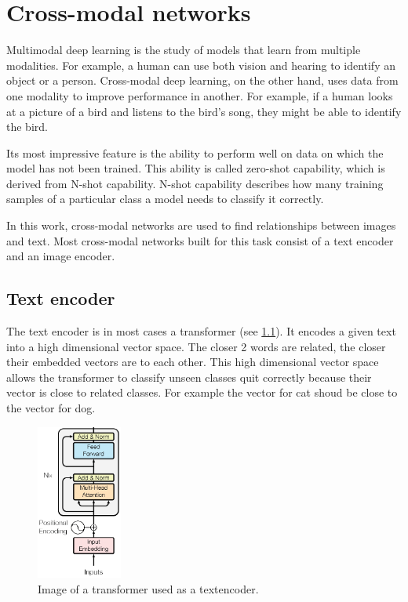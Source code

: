 %
%
%


\chapter{Cross-modal networks
    \label{chapter:crossmodalnetworks}}
    Multimodal deep learning is the study of models that learn from multiple modalities.
    For example, a human can use both vision and hearing to identify an object or a person.
    Cross-modal deep learning, on the other hand, uses data from one modality to improve performance in another.
    For example, if a human looks at a picture of a bird and listens to the bird's song, they might be able to identify the bird.

    Its most impressive feature is the ability to perform well on data on which the model has not been trained.
    This ability is called zero-shot capability, which is derived from N-shot capability.
    N-shot capability describes how many training samples of a particular class a model needs to classify it correctly.

    In this work, cross-modal networks are used to find relationships between images and text.
    Most cross-modal networks built for this task consist of a text encoder and an image encoder.

    \section{Text encoder}
    The text encoder is in most cases a transformer (see \cref{fig:crossmodalnetworks:textencoder}).
    It encodes a given text into a high dimensional vector space.
    The closer 2 words are related, the closer their embedded vectors are to each other.
    This high dimensional vector space allows the transformer to classify unseen classes quit correctly because their vector is close to related classes.
    For example the vector for cat shoud be close to the vector for dog.

    \begin{figure}
        \centering
        \includegraphics[width=0.25\textwidth]{Images/crossmodalnetworks/The-Transformer-encoder-structure.png}
        \caption{Image of a transformer used as a textencoder\cite{fig:encoder}.}
        \label{fig:crossmodalnetworks:textencoder}
    \end{figure}
    


